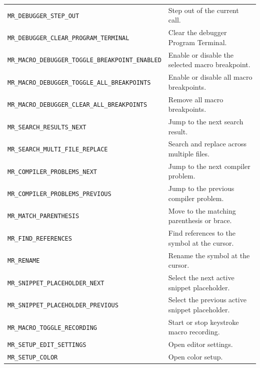 \documentclass[a4paper,10pt,twoside,openany]{book}
\newenvironment{mrmacextension}{\begin{changebar}}{\end{changebar}}
\begin{document}
\begin{mrmacextension}
\begin{longtable}{@{}L{0.50\textwidth}@{\hspace{0.8em}}L{0.40\textwidth}@{}}
\texttt{MR\_DEBUGGER\_STEP\_OUT} & Step out of the current call. \\
\texttt{MR\_DEBUGGER\_CLEAR\_PROGRAM\_TERMINAL} & Clear the debugger Program Terminal. \\
\texttt{MR\_MACRO\_DEBUGGER\_TOGGLE\_BREAKPOINT\_ENABLED} & Enable or disable the selected macro breakpoint. \\
\texttt{MR\_MACRO\_DEBUGGER\_TOGGLE\_ALL\_BREAKPOINTS} & Enable or disable all macro breakpoints. \\
\texttt{MR\_MACRO\_DEBUGGER\_CLEAR\_ALL\_BREAKPOINTS} & Remove all macro breakpoints. \\
\texttt{MR\_SEARCH\_RESULTS\_NEXT} & Jump to the next search result. \\
\texttt{MR\_SEARCH\_MULTI\_FILE\_REPLACE} & Search and replace across multiple files. \\
\texttt{MR\_COMPILER\_PROBLEMS\_NEXT} & Jump to the next compiler problem. \\
\texttt{MR\_COMPILER\_PROBLEMS\_PREVIOUS} & Jump to the previous compiler problem. \\
\texttt{MR\_MATCH\_PARENTHESIS} & Move to the matching parenthesis or brace. \\
\texttt{MR\_FIND\_REFERENCES} & Find references to the symbol at the cursor. \\
\texttt{MR\_RENAME} & Rename the symbol at the cursor. \\
\texttt{MR\_SNIPPET\_PLACEHOLDER\_NEXT} & Select the next active snippet placeholder. \\
\texttt{MR\_SNIPPET\_PLACEHOLDER\_PREVIOUS} & Select the previous active snippet placeholder. \\
\texttt{MR\_MACRO\_TOGGLE\_RECORDING} & Start or stop keystroke macro recording. \\
\texttt{MR\_SETUP\_EDIT\_SETTINGS} & Open editor settings. \\
\texttt{MR\_SETUP\_COLOR} & Open color setup. \\

\end{longtable}
\end{mrmacextension}
\end{document}
